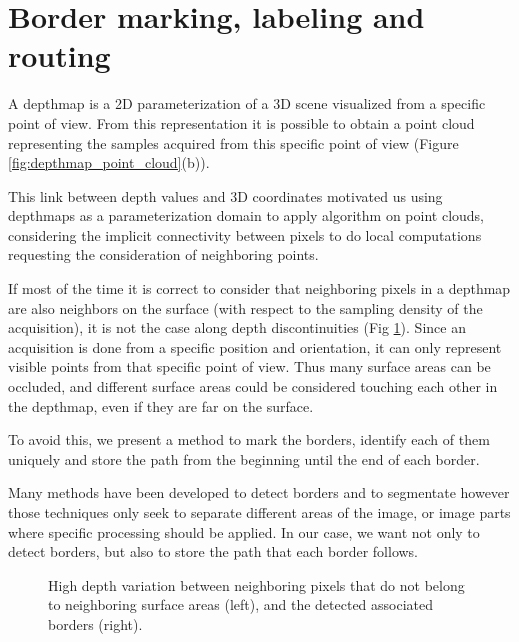 \documentclass[11pt,fleqn]{book} %
\begin{document}
\section{Border marking, labeling and routing}
\label{sec:border_marking}

A depthmap is a 2D parameterization of a 3D scene visualized from a specific point of view. From this representation it is possible to obtain a point cloud representing the samples acquired from this specific point of view (Figure \ref{fig:depthmap_point_cloud}(b)).

This link between depth values and 3D coordinates motivated us using depthmaps as a parameterization domain to apply algorithm on point clouds, considering the implicit connectivity between pixels to do local computations requesting the consideration of neighboring points.

If most of the time it is correct to consider that neighboring pixels in a depthmap are also neighbors on the surface (with respect to the sampling density of the acquisition), it is not the case along depth discontinuities (Fig \ref{fig:depth_discontinuity}).
Since an acquisition is done from a specific position and orientation, it can only represent visible points from that specific point of view. 
Thus many surface areas can be occluded, and different surface areas could be considered touching each other in the depthmap, even if they are far on the surface.

To avoid this, we present a method to mark the borders, identify each of them uniquely and store the path from the beginning until the end of each border.

Many methods have been developed to detect borders and to segmentate however those techniques only seek to separate different areas of the image, or image parts where specific processing should be applied.
In our case, we want not only to detect borders, but also to store the path that each border follows.

\begin{figure}
\centering
{}
\caption{High depth variation between neighboring pixels that do not belong to neighboring surface areas (left), and the detected associated borders (right).}
\label{fig:depth_discontinuity}
\end{figure}
\end{document}
